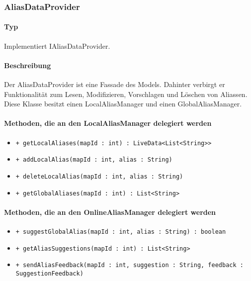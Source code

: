 \subsubsection{AliasDataProvider}
\paragraph*{Typ}
Implementiert IAliasDataProvider.
\paragraph*{Beschreibung}
Der AliasDataProvider ist eine Fassade des Models. 
Dahinter verbirgt er Funktionalität zum Lesen, Modifizieren, Vorschlagen und Löschen von Aliassen.\\
Diese Klasse besitzt einen LocalAliasManager und einen GlobalAliasManager.

\paragraph*{Methoden, die an den LocalAliasManager delegiert werden}
\begin{itemize}
    \item \texttt{+ getLocalAliases(mapId : int) : LiveData<List<String>>}
    \item \texttt{+ addLocalAlias(mapId : int, alias : String)}
    \item \texttt{+ deleteLocalAlias(mapId : int, alias : String)}
    \item \texttt{+ getGlobalAliases(mapId : int) : List<String>}%
\end{itemize}

\paragraph*{Methoden, die an den OnlineAliasManager delegiert werden}
\begin{itemize}
    \item \texttt{+ suggestGlobalAlias(mapId : int, alias : String) : boolean}
    \item \texttt{+ getAliasSuggestions(mapId : int) : List<String>}
    \item \texttt{+ sendAliasFeedback(mapId : int, suggestion : String, feedback : SuggestionFeedback)}
\end{itemize}
